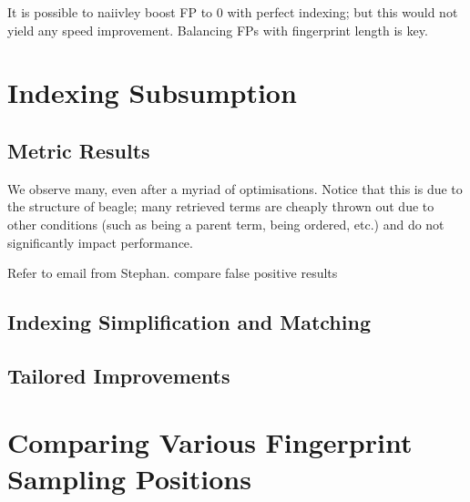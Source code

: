 It is possible to naiivley boost FP to 0 with perfect indexing; but this
would not yield any speed improvement. Balancing FPs with fingerprint
length is key.

\section{Indexing Subsumption}
\label{sec:indexresults}

\subsection{Metric Results}
\label{section:instr2}

We observe many, even after a myriad of optimisations. Notice
that this is due to the structure of beagle; many retrieved terms
are cheaply thrown out due to other conditions (such as being a parent
term, being ordered, etc.) and do not significantly impact performance.

Refer to email from Stephan. compare false positive results

\subsection{Indexing Simplification and Matching}

\subsection{Tailored Improvements}
\label{sec:tailresults}


\section{Comparing Various Fingerprint Sampling Positions}




